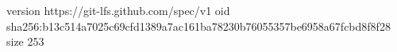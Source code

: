 version https://git-lfs.github.com/spec/v1
oid sha256:b13c514a7025c69cfd1389a7ac161ba78230b76055357be6958a67fcbd8f8f28
size 253
